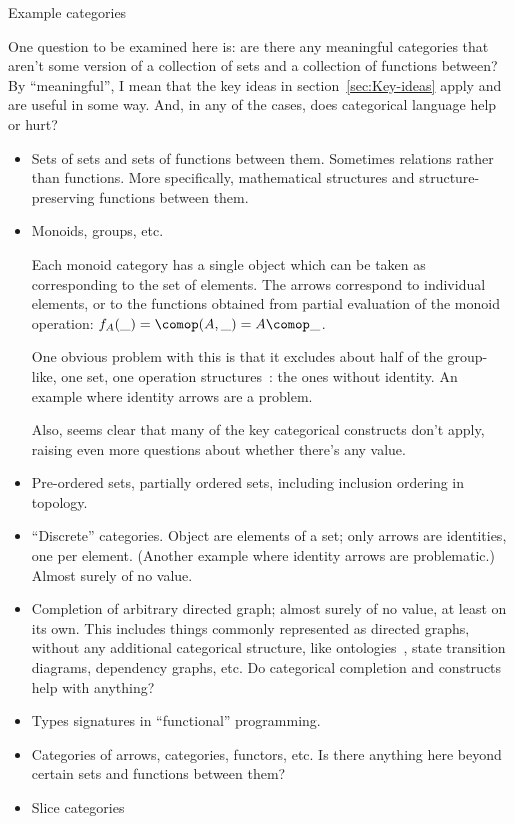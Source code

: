 \begin{plSection}{Example categories}
\label{sec:Example-categories}

One question to be examined here is: are there any meaningful
categories that aren't some version of a collection of sets
and a collection of functions between? 
By ``meaningful'', I mean that the key ideas 
in section~\ref{sec:Key-ideas} apply
and are useful in some way.
And, in any of the cases, 
does categorical language help or hurt?

\begin{itemize}
  \item Sets of sets and sets of functions between them.
Sometimes relations rather than functions.
More specifically, mathematical structures and
structure-preserving functions between them.

  \item Monoids, groups, etc. \par
  Each monoid category has a single object which can be taken as
  corresponding to the set of elements. The arrows correspond to 
  individual elements, or to the functions obtained from partial
  evaluation of the monoid operation: 
  $f_A(\_)= \comop (A,\_) = A \comop \_$.\par
  One obvious problem with this is that it excludes about half of
  the group-like, one set, one operation structures~\cite{wiki:Magma}: 
  the ones without identity. 
  An example where identity arrows are a problem. \par
  Also, seems clear that many of the key categorical constructs
  don't apply, raising even more questions about whether there's
  any value.
  
  \item Pre-ordered sets, partially ordered sets, including
  inclusion ordering in topology.
  
  
  \item ``Discrete'' categories. Object are elements of a set; 
  only arrows are identities, one per element. 
  (Another example where identity arrows are problematic.)
  Almost surely of no value.
  
  \item Completion of arbitrary directed graph; 
  almost surely of no value, at least on its own.
  This includes things commonly represented as directed graphs,
  without any additional categorical structure, 
  like ontologies~\cite{Spivak:2013:CatTheoryForScientists},
  state transition diagrams, dependency graphs, etc.
  Do categorical completion and constructs help with anything?
  
  \item Types signatures in ``functional'' programming.
  
  \item Categories of arrows, categories, functors, etc.
  Is there anything here beyond certain sets and functions between
  them?
  \item Slice categories~\cite[sec~2.6.10]{BarrWells:2020}
\end{itemize}
\end{plSection}%
